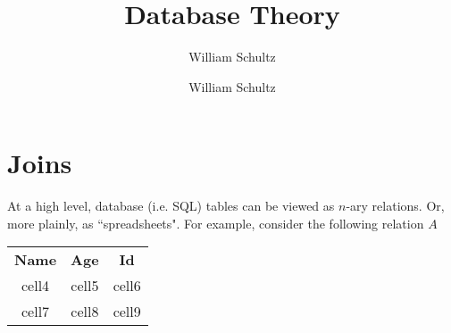 \documentclass[10pt,a4paper]{article}
\author{William Schultz}
\begin{document}
\title{Database Theory}
\author{William Schultz}
\maketitle

\section*{Joins}

At a high level, database (i.e. SQL) tables can be viewed as $n$-ary relations. Or, more plainly, as ``spreadsheets". For example, consider the following relation $A$
\begin{center}
    \begin{tabular}{ c c c }
     \textbf{Name} & \textbf{Age} & \textbf{Id} \\ 
     cell4 & cell5 & cell6 \\  
     cell7 & cell8 & cell9    
\end{tabular}
\end{center}
\end{document}
